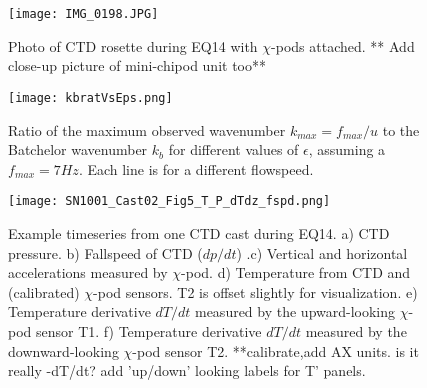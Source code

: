 \documentclass{ametsoc}
\begin{document}
%

\begin{figure}[t]
  \noindent\texttt{[image: IMG\_0198.JPG]}\\
  \caption{Photo of CTD rosette during EQ14 with $\chi$-pods attached. ** Add close-up picture of mini-chipod unit too**}
  \label{f1}
\end{figure}


\begin{figure}[t]
  \noindent\texttt{[image: kbratVsEps.png]}\\
  \caption{Ratio of the maximum observed wavenumber $k_{max}=f_{max}/u$ to the Batchelor wavenumber $k_b$ for different values of $\epsilon$, assuming a $f_{max}=7Hz$. Each line is for a different flowspeed.}
  \label{kbratVseps}
\end{figure}


\begin{figure}[t]
  \noindent\texttt{[image: SN1001\_Cast02\_Fig5\_T\_P\_dTdz\_fspd.png]}\\
  \caption{Example timeseries from one CTD cast during EQ14. a) CTD pressure. b) Fallspeed of CTD ($dp/dt$) .c) Vertical and horizontal accelerations measured by $\chi$-pod. d) Temperature from CTD and (calibrated) $\chi$-pod sensors. T2 is offset slightly for visualization. e) Temperature derivative $dT/dt$ measured by the upward-looking $\chi$-pod sensor T1. f) Temperature derivative $dT/dt$ measured by the downward-looking $\chi$-pod sensor T2. **calibrate,add AX units. is it really -dT/dt? add 'up/down' looking labels for T' panels.}
  \label{f2}
\end{figure}
\end{document}
